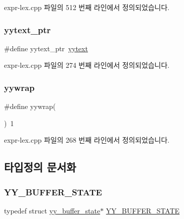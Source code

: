 expr-\/lex.\+cpp 파일의 512 번째 라인에서 정의되었습니다.

\mbox{\label{expr-lex_8cpp_a790a191a93ef4d3b8c0bb43fd7480052}} 
\subsubsection{\texorpdfstring{yytext\+\_\+ptr}{yytext\_ptr}}
{\footnotesize\ttfamily \#define yytext\+\_\+ptr~\mbox{\hyperlink{expr_node_8cpp_ad9264b77d56b6971f29739e2bda77f51}{yytext}}}



expr-\/lex.\+cpp 파일의 274 번째 라인에서 정의되었습니다.

\mbox{\label{expr-lex_8cpp_ade1e2db9970733fbc3d9fecd09ce9771}} 
\subsubsection{\texorpdfstring{yywrap}{yywrap}}
{\footnotesize\ttfamily \#define yywrap(\begin{DoxyParamCaption}{ }\end{DoxyParamCaption})~1}



expr-\/lex.\+cpp 파일의 268 번째 라인에서 정의되었습니다.



\subsection{타입정의 문서화}
\mbox{\label{expr-lex_8cpp_a4e5bd2d129903df83f3d13effaf8f3e4}} 
\subsubsection{\texorpdfstring{Y\+Y\+\_\+\+B\+U\+F\+F\+E\+R\+\_\+\+S\+T\+A\+TE}{YY\_BUFFER\_STATE}}
{\footnotesize\ttfamily typedef struct \mbox{\hyperlink{structyy__buffer__state}{yy\+\_\+buffer\+\_\+state}}$\ast$ \mbox{\hyperlink{expr-lex_8cpp_a4e5bd2d129903df83f3d13effaf8f3e4}{Y\+Y\+\_\+\+B\+U\+F\+F\+E\+R\+\_\+\+S\+T\+A\+TE}}}



